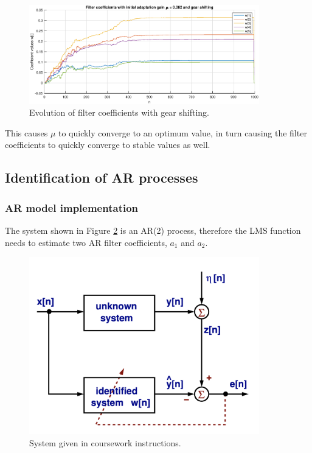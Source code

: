 \begin{figure}[H]
    \centering
    \includegraphics[width=10cm]{assignment4figs/mu002_shift.eps}
    \caption{Evolution of filter coefficients with gear shifting.}
    \label{fig:gearshifting}
\end{figure}

\noindent
This causes $\mu$ to quickly converge to an optimum value, in turn causing the filter coefficients to quickly converge to stable values as well.

\subsection{Identification of AR processes}

\subsubsection{AR model implementation}

The system shown in Figure \ref{fig:sys} is an AR(2) process, therefore the LMS function needs to estimate two AR filter coefficients, $a_1$ and $a_2$. 

\begin{figure}[H]
    \centering
    \includegraphics[width=10cm]{assignment4figs/system.png}
    \caption{System given in coursework instructions.}
    \label{fig:sys}
\end{figure}

